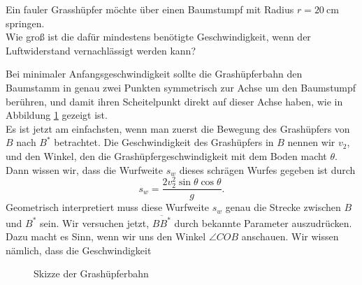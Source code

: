\begin{Exercise}[label = grassh, title = fauler Grasshüpfer, origin = P.Gnädig, difficulty = 5]
	Ein fauler Grasshüpfer möchte über einen Baumstumpf mit Radius $r = 20~\mathrm{cm}$ springen.\\
	Wie groß ist die dafür mindestens benötigte Geschwindigkeit, wenn der Luftwiderstand vernachlässigt werden kann?
\end{Exercise}
\begin{Answer}
	Bei minimaler Anfangsgeschwindigkeit sollte die Grashüpferbahn den Baumstamm in genau zwei Punkten symmetrisch zur Achse um den Baumstumpf berühren, und damit ihren Scheitelpunkt direkt auf dieser Achse haben, wie in Abbildung \ref{fig:grasshs} gezeigt ist.\\
	Es ist jetzt am einfachsten, wenn man zuerst die Bewegung des Grashüpfers von $ B$ nach $B^{\ast}$ betrachtet. Die Geschwindigkeit des Grashüpfers in $B$ nennen wir $v_2$, und den Winkel, den die Grashüpfergeschwindigkeit mit dem Boden macht $\theta$.\\
	Dann wissen wir, dass die Wurfweite $s_w$ dieses schrägen Wurfes gegeben ist durch
	\begin{equation}\label{grassh:weite}
		s_w = \frac{2 v_2^2 \sin \theta \cos \theta}{g}.
	\end{equation}
	Geometrisch interpretiert muss diese Wurfweite $s_w$ genau die Strecke zwischen $B$ und $B^{\ast}$ sein. Wir versuchen jetzt, $\overline{BB^{\ast}}$ durch bekannte Parameter auszudrücken.\\
	Dazu macht es Sinn, wenn wir uns den Winkel $\angle COB$ anschauen. Wir wissen nämlich, dass die Geschwindigkeit 
\end{Answer}
\begin{figure}[h]
	\centering
	
	\caption{Skizze der Grashüpferbahn}
	\label{fig:grasshs}		
\end{figure}